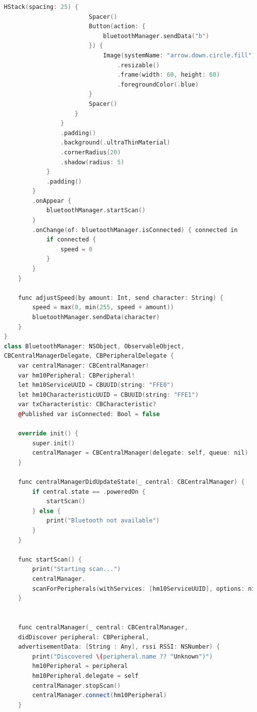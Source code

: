 \begin{lstlisting}[language=c++]
                    HStack(spacing: 25) {
                        Spacer()
                        Button(action: {
                            bluetoothManager.sendData("b")
                        }) {
                            Image(systemName: "arrow.down.circle.fill")
                                .resizable()
                                .frame(width: 60, height: 60)
                                .foregroundColor(.blue)
                        }
                        Spacer()
                    }
                }
                .padding()
                .background(.ultraThinMaterial)
                .cornerRadius(20)
                .shadow(radius: 5)
            }
            .padding()
        }
        .onAppear {
            bluetoothManager.startScan()
        }
        .onChange(of: bluetoothManager.isConnected) { connected in
            if connected {
                speed = 0
            }
        }
    }

    func adjustSpeed(by amount: Int, send character: String) {
        speed = max(0, min(255, speed + amount))
        bluetoothManager.sendData(character)
    }
}
class BluetoothManager: NSObject, ObservableObject,
CBCentralManagerDelegate, CBPeripheralDelegate {
    var centralManager: CBCentralManager!
    var hm10Peripheral: CBPeripheral!
    let hm10ServiceUUID = CBUUID(string: "FFE0")
    let hm10CharacteristicUUID = CBUUID(string: "FFE1")
    var txCharacteristic: CBCharacteristic?
    @Published var isConnected: Bool = false

    override init() {
        super.init()
        centralManager = CBCentralManager(delegate: self, queue: nil)
    }

    func centralManagerDidUpdateState(_ central: CBCentralManager) {
        if central.state == .poweredOn {
            startScan()
        } else {
            print("Bluetooth not available")
        }
    }

    func startScan() {
        print("Starting scan...")
        centralManager.
        scanForPeripherals(withServices: [hm10ServiceUUID], options: nil)
    }


    func centralManager(_ central: CBCentralManager,
    didDiscover peripheral: CBPeripheral,
    advertisementData: [String : Any], rssi RSSI: NSNumber) {
        print("Discovered \(peripheral.name ?? "Unknown")")
        hm10Peripheral = peripheral
        hm10Peripheral.delegate = self
        centralManager.stopScan()
        centralManager.connect(hm10Peripheral)
    }


\end{lstlisting}
